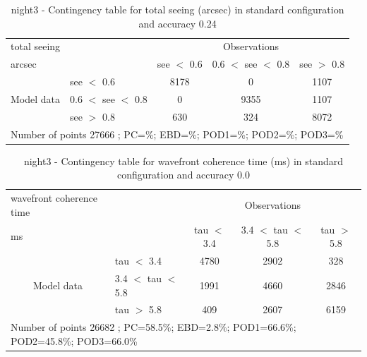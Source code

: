\begin{table}[p!]
\begin{center}
\begin{tabular}{llccc}
\hline
{total seeing}                                       &                                                    & \multicolumn{3}{c}{Observations}                 \\
{arcsec}                                       &                             & see $<$ 0.6   & 0.6 $<$ see $<$ 0.8 & see $>$ 0.8 \\
\hline
\multicolumn{1}{c}{\multirow{3}{*}{Model data}}  & see $<$ 0.6             & 8178                & 0                       & 1107              \\
                                                 & 0.6  $<$ see $<$ 0.8 & 0                & 9355                       & 1107              \\
                                                 & see $>$ 0.8             & 630                & 324                       & 8072              \\
\hline
\multicolumn{5}{l}{ Number of points        27666 ; PC=\%; EBD=\%; POD1=\%; POD2=\%; POD3=\%}
\end{tabular}
\end{center}
\caption{night3 - Contingency table for  total seeing (arcsec) in standard configuration and accuracy 0.24}
\label{tab:contingencyseeBEF:night3}
\end{table}
\clearpage
\begin{table}[p!]
\begin{center}
\begin{tabular}{llccc}
\hline
{wavefront coherence time}                                       &                                                    & \multicolumn{3}{c}{Observations}                 \\
{ms}                                       &                             & tau $<$ 3.4   & 3.4 $<$ tau $<$ 5.8 & tau $>$ 5.8 \\
\hline
\multicolumn{1}{c}{\multirow{3}{*}{Model data}}  & tau $<$ 3.4             & 4780                & 2902                       & 328              \\
                                                 & 3.4  $<$ tau $<$ 5.8 & 1991                & 4660                       & 2846              \\
                                                 & tau $>$ 5.8             & 409                & 2607                       & 6159              \\
\hline
\multicolumn{5}{l}{ Number of points        26682 ; PC=58.5\%; EBD=2.8\%; POD1=66.6\%; POD2=45.8\%; POD3=66.0\%}
\end{tabular}
\end{center}
\caption{night3 - Contingency table for  wavefront coherence time (ms) in standard configuration and accuracy 0.0}
\label{tab:contingencytauBEF:night3}
\end{table}
